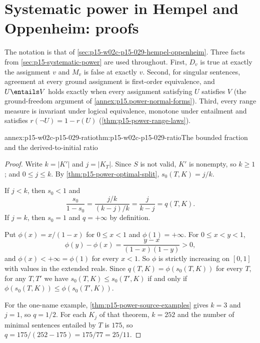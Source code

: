 \section{Systematic power in Hempel and Oppenheim: proofs}
\label{sec:annex-p15-w02c-p15-029-hempel-oppenheim}

The notation is that of \cref{sec:p15-w02c-p15-029-hempel-oppenheim}.
Three facts from \cref{sec:p15-systematic-power} are used throughout.
First, \(D_v\) is true at exactly the assignment \(v\) and \(M_v\) is
false at exactly \(v\). Second, for singular sentences, agreement at every
ground assignment is first-order equivalence, and \(U\entails V\) holds
exactly when every assignment satisfying \(U\) satisfies \(V\) (the
ground-freedom argument of \cref{annex:p15.power-normal-forms}). Third,
every range measure is invariant under logical equivalence, monotone
under entailment and satisfies \(r(\neg U)=1-r(U)\)
(\cref{thm:p15-power-range-laws}).

\begin{annexitem}{annex:p15-w02c-p15-029-ratio}{thm:p15-w02c-p15-029-ratio}{The bounded fraction and the derived-to-initial ratio}
\begin{proof}
Write \(k=|K'|\) and \(j=|K_T|\). Since \(S\) is not valid, \(K'\) is
nonempty, so \(k\ge1\); and \(0\le j\le k\). By
\cref{thm:p15-power-optimal-split}, \(s_0(T,K)=j/k\).

If \(j<k\), then \(s_0<1\) and
\[
 \frac{s_0}{1-s_0}=\frac{j/k}{(k-j)/k}=\frac{j}{k-j}=q(T,K).
\]
If \(j=k\), then \(s_0=1\) and \(q=+\infty\) by definition.

Put \(\phi(x)=x/(1-x)\) for \(0\le x<1\) and \(\phi(1)=+\infty\).
For \(0\le x<y<1\),
\[
 \phi(y)-\phi(x)=\frac{y-x}{(1-x)(1-y)}>0,
\]
and \(\phi(x)<+\infty=\phi(1)\) for every \(x<1\). So \(\phi\) is strictly
increasing on \([0,1]\) with values in the extended reals. Since
\(q(T,K)=\phi(s_0(T,K))\) for every \(T\), for any \(T,T'\) we have
\(s_0(T,K)\le s_0(T',K)\) if and only if
\(\phi(s_0(T,K))\le\phi(s_0(T',K))\).

For the one-name example, \cref{thm:p15-power-source-examples} gives
\(k=3\) and \(j=1\), so \(q=1/2\). For each \(K_j\) of that theorem,
\(k=252\) and the number of minimal sentences entailed by \(T\) is
\(175\), so \(q=175/(252-175)=175/77=25/11\).
\end{proof}
\end{annexitem}

